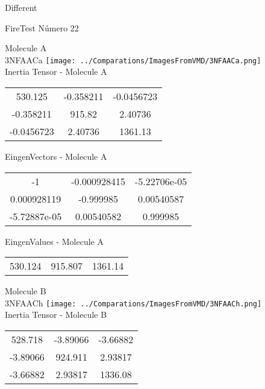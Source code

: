 \begin{center}
\vtab
\vtab
\textcolor{NavyBlue}{\Large Different}
\end{center}

 \newpage

\vtab[-2cm]
\begin{center}
{\large FireTest \tab Número 22}
\end{center}
\begin{multicols}{2}
\begin{center}

Molecule A \\ 
3NFAACa
\texttt{[image: ../Comparations/ImagesFromVMD/3NFAACa.png]}
\\
Inertia Tensor - Molecule A \\
\vtab

\begin{tabular}{|c c c|}
530.125	 & 	-0.358211	 & 	-0.0456723	 \\
-0.358211	 & 	915.82	 & 	2.40736	 \\
-0.0456723	 & 	2.40736	 & 	1361.13
\end{tabular}

\vtab
 EingenVectors - Molecule A     \\
\vtab
\begin{tabular}{|c c c|}
-1	 & 	-0.000928415	 & 	-5.22706e-05	 \\
0.000928119	 & 	-0.999985	 & 	0.00540587	 \\
-5.72887e-05	 & 	0.00540582	 & 	0.999985
\end{tabular}

\vtab
 EingenValues - Molecule A     \\
\vtab
\begin{tabular}{|c c c|}
530.124	 & 	915.807	 & 	1361.14	 \\
\end{tabular}
\columnbreak

Molecule B \\ 
3NFAACh
\texttt{[image: ../Comparations/ImagesFromVMD/3NFAACh.png]}
\\
Inertia Tensor - Molecule B \\
\vtab

\begin{tabular}{|c c c|}
528.718	 & 	-3.89066	 & 	-3.66882	 \\
-3.89066	 & 	924.911	 & 	2.93817	 \\
-3.66882	 & 	2.93817	 & 	1336.08
\end{tabular}


\end{center}
\end{multicols}
